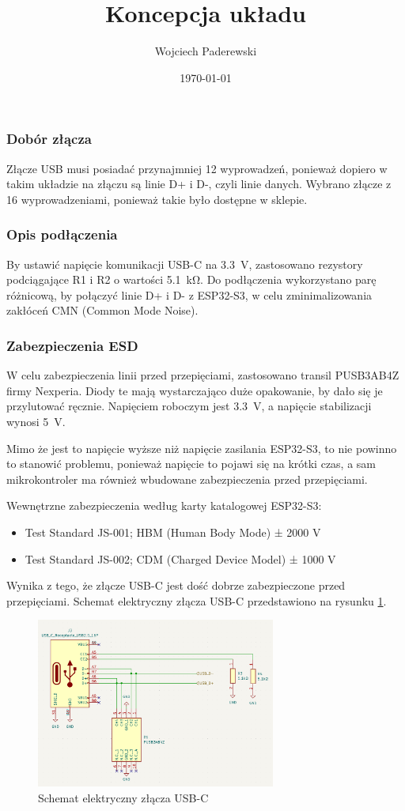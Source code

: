 \documentclass[../../main.tex]{subfiles}
\author{Wojciech Paderewski}
\date{\today}
\title{Koncepcja układu}
\begin{document}
\subsubsection{Dobór złącza}
Złącze USB musi posiadać przynajmniej 12 wyprowadzeń, ponieważ dopiero w takim układzie na złączu są linie D+ i D-, czyli linie danych.
Wybrano złącze z 16 wyprowadzeniami, ponieważ takie było dostępne w sklepie.
\subsubsection{Opis podłączenia}
By ustawić napięcie komunikacji USB-C na \SI{3.3}{\volt}, zastosowano rezystory podciągające R1 i R2 o wartości \SI{5.1}{\kilo\ohm}.
Do podłączenia wykorzystano parę różnicową, by połączyć linie D+ i D- z ESP32-S3, w celu zminimalizowania zakłóceń CMN (Common Mode Noise).
\subsubsection{Zabezpieczenia ESD}
W celu zabezpieczenia linii przed przepięciami, zastosowano transil PUSB3AB4Z firmy Nexperia. Diody te mają wystarczająco duże opakowanie, by dało się je przylutować ręcznie. Napięciem roboczym jest \SI{3.3}{\volt},
a napięcie stabilizacji wynosi \SI{5}{\volt}.

Mimo że jest to napięcie wyższe niż napięcie zasilania ESP32-S3, to nie powinno to stanowić problemu, 
ponieważ napięcie to pojawi się na krótki czas, a sam mikrokontroler ma również wbudowane zabezpieczenia przed przepięciami.

Wewnętrzne zabezpieczenia według karty katalogowej ESP32-S3:
\begin{itemize}
    \item Test Standard JS-001; HBM (Human Body Mode) ± 2000 V
    \item Test Standard JS-002; CDM (Charged Device Model) ± 1000 V
\end{itemize}
Wynika z tego, że złącze USB-C jest dość dobrze zabezpieczone przed przepięciami.
Schemat elektryczny złącza USB-C przedstawiono na rysunku \ref{fig:usb-c_schemat}.
\begin{figure}[H]
    \centering
    \includegraphics[width=0.7\textwidth]{usb-c_schemat.png}
    \caption{Schemat elektryczny złącza USB-C}
    \label{fig:usb-c_schemat}
\end{figure}
\end{document}
